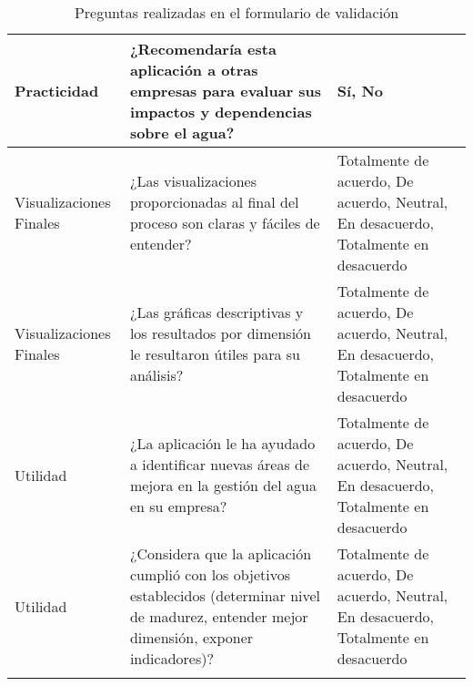\begin{longtable}{p{2.5cm}|p{8cm}|p{5cm}}
\hline
Practicidad & ¿Recomendaría esta aplicación a otras empresas para evaluar sus impactos y dependencias sobre el agua? & Sí, No \\
\hline
Visualizaciones Finales & ¿Las visualizaciones proporcionadas al final del proceso son claras y fáciles de entender? & Totalmente de acuerdo, De acuerdo, Neutral, En desacuerdo, Totalmente en desacuerdo \\
\hline
Visualizaciones Finales & ¿Las gráficas descriptivas y los resultados por dimensión le resultaron útiles para su análisis? & Totalmente de acuerdo, De acuerdo, Neutral, En desacuerdo, Totalmente en desacuerdo \\
\hline
Utilidad & ¿La aplicación le ha ayudado a identificar nuevas áreas de mejora en la gestión del agua en su empresa? & Totalmente de acuerdo, De acuerdo, Neutral, En desacuerdo, Totalmente en desacuerdo \\
\hline
Utilidad & ¿Considera que la aplicación cumplió con los objetivos establecidos (determinar nivel de madurez, entender mejor dimensión, exponer indicadores)? & Totalmente de acuerdo, De acuerdo, Neutral, En desacuerdo, Totalmente en desacuerdo \\
\hline
\caption{Preguntas realizadas en el formulario de validación}
\label{tab:formulari-validacion}
\end{longtable}
    
